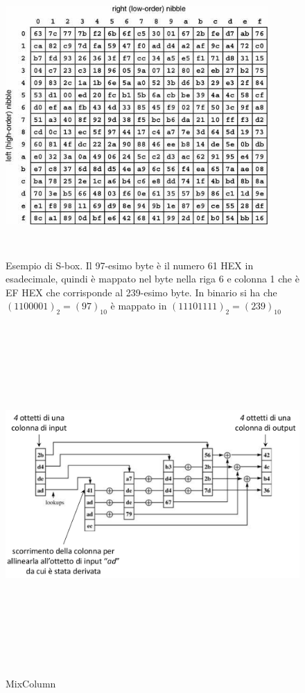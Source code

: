 \begin{figure}[htbp]
	\centering%
	\subfigure%
	{\includegraphics[height=10cm, width=10cm, keepaspectratio]{Immagini/chiave_segreta/rijndael_sbox.png}}
	\caption{Esempio di S-box. Il 97-esimo byte è il numero 61 HEX in esadecimale, quindi è mappato nel byte nella riga 6 e colonna 1 che è EF HEX che corrisponde al 239-esimo byte. In binario si ha che $(1100001)_{2} = (97)_{10}$ è mappato in $(11101111)_{2} = (239)_{10}$ \label{fig:Rij_sbox}} 	
\end{figure}

\begin{figure}[htbp]
	\centering%
	\subfigure%
	{\includegraphics[height=13cm, width=13cm, keepaspectratio]{Immagini/chiave_segreta/rijndael_mixcol.png}}
	\caption{MixColumn \label{fig:Rij_mixcol}} 	
\end{figure}

